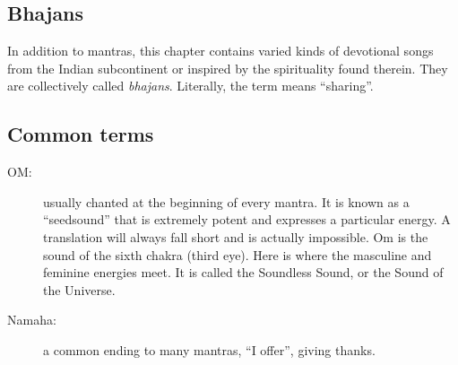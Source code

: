   \subsection*{Bhajans}
  In addition to mantras, this chapter contains varied kinds of devotional songs from the Indian
  subcontinent or inspired by the spirituality found therein. They are collectively called
  \emph{bhajans}. Literally, the term means ``sharing''.

  \subsection*{Common terms}
  \begin{description}
   \item[OM:] usually chanted at the beginning of every mantra. It is known as a ``seedsound'' that
     is extremely potent and expresses a particular energy. A translation will always fall short
     and is actually impossible. Om is the sound of the sixth chakra (third eye). Here is where
     the masculine and feminine energies meet. It is called the Soundless Sound, or the Sound of
     the Universe.
   \item[Namaha:] a common ending to many mantras, ``I offer'', giving thanks.
  \end{description}
